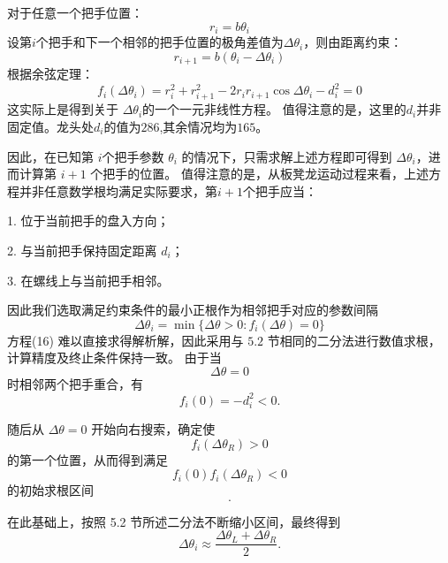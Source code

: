 对于任意一个把手位置：
\begin{equation}
r_i = b\theta_i
\end{equation}
设第$i$个把手和下一个相邻的把手位置的极角差值为$\Delta\theta_i$，则由距离约束：
\begin{equation}
r_{i+1} = b(\theta_i - \Delta\theta_i)
\end{equation}
根据余弦定理：
\begin{equation}
f_i(\Delta\theta_i) = r_i^2 + r_{i+1}^2 - 2r_ir_{i+1}\cos\Delta\theta_i - d_i^2 = 0
\end{equation}
这实际上是得到关于 $\Delta\theta_i$的一个一元非线性方程。
值得注意的是，这里的$d_i$并非固定值。龙头处$d_i$的值为$286$,其余情况均为$165$。

因此，在已知第 $i$个把手参数 $\theta_i$ 的情况下，只需求解上述方程即可得到 $\Delta\theta_i$，进而计算第 $i+1$ 个把手的位置。
值得注意的是，从板凳龙运动过程来看，上述方程并非任意数学根均满足实际要求，第$i+1$个把手应当：

1. 位于当前把手的盘入方向；

2. 与当前把手保持固定距离 $d_i$；

3. 在螺线上与当前把手相邻。

因此我们选取满足约束条件的最小正根作为相邻把手对应的参数间隔
\begin{equation}
\Delta\theta_i = \min\{\Delta\theta > 0 : f_i(\Delta\theta) = 0\}
\end{equation}
方程(16) 难以直接求得解析解，因此采用与 $5.2$ 节相同的二分法进行数值求根，计算精度及终止条件保持一致。
由于当
\begin{equation}
\Delta\theta = 0
\end{equation}
时相邻两个把手重合，有
\begin{equation}
f_i(0) = -d_i^2 < 0.
\end{equation}

随后从 $\Delta\theta = 0$ 开始向右搜索，确定使
\begin{equation}
f_i(\Delta\theta_R) > 0
\end{equation}
的第一个位置，从而得到满足
\begin{equation}
f_i(0)f_i(\Delta\theta_R) < 0
\end{equation}
的初始求根区间
\begin{equation}
[0,\,\Delta\theta_R].
\end{equation}

在此基础上，按照 5.2 节所述二分法不断缩小区间，最终得到
\begin{equation}
\Delta\theta_i \approx \frac{\Delta\theta_L + \Delta\theta_R}{2}.
\end{equation}

